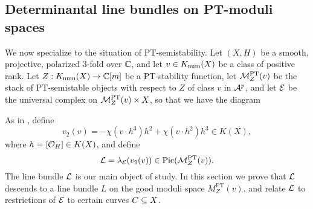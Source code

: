 \subsection{Determinantal line bundles on PT-moduli spaces}

We now specialize to the situation of PT-semistability. Let $(X, H)$ be a smooth, projective, polarized 3-fold over $\mathbb{C}$, and let $v \in K_{\mathrm{num}}(X)$ be a class of positive rank. Let $Z: K_{\mathrm{num}}(X) \to \mathbb{C}[m]$ be a PT-stability function, let $\mathcal{M}^{\text{PT}}_Z(v)$ be the stack of PT-semistable objects with respect to $Z$ of class $v$ in $\mathcal{A}^p$, and let $\mathcal{E}$ be the universal complex on $\mathcal{M}^{\text{PT}}_Z(v) \times X$, so that we have the diagram
\begin{center}
\end{center}
As in \cite[Example 8.1.8 (iii)]{HL}, define
\[ v_2(v) = -\chi(v \cdot h^3) h^2 + \chi(v \cdot h^2) h^3 \in K(X), \]
where $h = [\mathcal{O}_H] \in K(X)$, and define
\[ \mathcal{L} = \lambda_{\mathcal{E}}(v_2(v)) \in \mathrm{Pic}(\mathcal{M}^{\text{PT}}_Z(v)). \]
The line bundle $\mathcal{L}$ is our main object of study. In this section we prove that $\mathcal{L}$ descends to a line bundle $L$ on the good moduli space $M^{\text{PT}}_Z(v)$, and relate $\mathcal{L}$ to restrictions of $\mathcal{E}$ to certain curves $C \subseteq X$. 

